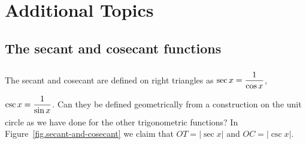 
\chapter{Additional Topics}\label{ch.additional}

\section{The secant and cosecant functions}

The secant and cosecant are defined on right triangles as $\sec x = \rule[-10pt]{0pt}{28pt}\disfrac{1}{\cos x}$, $\csc x = \rule[-10pt]{0pt}{28pt}\disfrac{1}{\sin x}$.
Can they be defined geometrically from a construction on the unit circle as we have done for the other trigonometric functions?
In Figure~\ref{fig.secant-and-cosecant} we claim that $OT=|\sec x|$ and $OC=|\csc x|$. 

